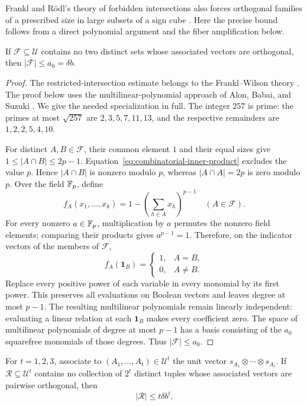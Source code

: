 Frankl and R\"odl's theory of forbidden intersections also forces
orthogonal families of a prescribed size in large subsets of a sign
cube \cite[Theorem~1.11]{FR1987}.  Here the precise bound follows
from a direct polynomial argument and the fiber amplification below.

\begin{lemma}\label{lem:restricted-intersections}
If \(\mathcal F\subseteq\mathcal U\) contains no two distinct sets
whose associated vectors are orthogonal, then
\(|\mathcal F|\leq a_0=\delta b\).
\end{lemma}

\begin{proof}
The restricted-intersection estimate belongs to the Frankl--Wilson
theory \cite{FW1981}.  The proof below uses the multilinear-polynomial
approach of Alon, Babai, and Suzuki \cite{ABS1991}.  We give the needed
specialization in full.
The integer \(257\) is prime: the primes at most \(\sqrt{257}\) are
\(2,3,5,7,11,13\), and the respective remainders are
\(1,2,2,5,4,10\).

For distinct \(A,B\in\mathcal F\), their common element \(1\) and their
equal sizes give \(1\leq|A\cap B|\leq2p-1\).
Equation~\eqref{eq:combinatorial-inner-product} excludes the value
\(p\).  Hence \(|A\cap B|\) is nonzero modulo \(p\), whereas
\(|A\cap A|=2p\) is zero modulo \(p\).  Over the field \(\mathbb F_p\), define
\[
 f_A(x_1,\ldots,x_k)
 =1-\left(\sum_{h\in A}x_h\right)^{p-1}
 \quad(A\in\mathcal F).
\]
For every nonzero \(a\in\mathbb F_p\), multiplication by \(a\) permutes the
nonzero field elements; comparing their products gives \(a^{p-1}=1\).
Therefore, on the indicator vectors of the members of \(\mathcal F\),
\[
 f_A(\mathbf1_B)=
 \begin{cases}
  1,&A=B,\\
  0,&A\ne B.
 \end{cases}
\]
Replace every positive power of each variable in every monomial by
its first power.  This preserves all evaluations on Boolean vectors
and leaves degree at most \(p-1\).  The resulting multilinear
polynomials remain linearly independent: evaluating a linear relation
at each \(\mathbf1_B\) makes every coefficient zero.  The space of
multilinear polynomials of degree at most \(p-1\) has a basis consisting
of the \(a_0\) squarefree monomials of those degrees.  Thus
\(|\mathcal F|\leq a_0\).
\end{proof}

\begin{lemma}\label{lem:fiber-amplification}
For \(t=1,2,3\), associate to
\((A_1,\ldots,A_t)\in\mathcal U^t\) the unit vector
\(s_{A_1}\otimes\cdots\otimes s_{A_t}\).
If \(\mathcal R\subseteq\mathcal U^t\) contains no collection of
\(2^t\) distinct tuples whose associated vectors are pairwise
orthogonal, then
\[
 |\mathcal R|\leq t\delta b^t.
\]
\end{lemma}

